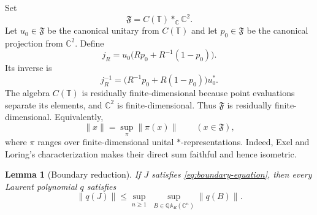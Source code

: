 \documentclass[preprints,article,submit,oneauthor]{Definitions/mdpi}
\newcounter{manuscriptresult}[section]
\theoremstyle{mdpi}
\newtheorem{lemma}[manuscriptresult]{Lemma}
\theoremstyle{definition}
\newcommand{\C}{\mathbb C}
\begin{document}
Set
\begin{equation}
  \mathfrak F=C(\mathbb T)*_{\C}\C^2.
  \label{eq:free-product}
\end{equation}
Let $u_0\in\mathfrak F$ be the canonical unitary from $C(\mathbb T)$
and let $p_0\in\mathfrak F$ be the canonical projection from $\C^2$.
Define
\begin{equation}
  j_R=u_0\bigl(Rp_0+R^{-1}(1-p_0)\bigr).
  \label{eq:universal-boundary-element}
\end{equation}
Its inverse is
\begin{equation}
  j_R^{-1}=\bigl(R^{-1}p_0+R(1-p_0)\bigr)u_0^*.
  \label{eq:universal-boundary-inverse}
\end{equation}
The algebra $C(\mathbb T)$ is residually finite-dimensional because
point evaluations separate its elements, and $\C^2$ is
finite-dimensional.  Thus $\mathfrak F$ is residually
finite-dimensional.  Equivalently,
\begin{equation}
  \lVert x\rVert
  =\sup_{\pi}\lVert\pi(x)\rVert
  \qquad(x\in\mathfrak F),
  \label{eq:RFD-norm}
\end{equation}
where $\pi$ ranges over finite-dimensional unital
$*$-representations.  Indeed, Exel and Loring's characterization
\cite[Theorem~2.4]{ExelLoring1992} makes their direct sum faithful and
hence isometric.

\begin{lemma}[Boundary reduction]
\label{lem:boundary-reduction}
If $J$ satisfies \eqref{eq:boundary-equation}, then every Laurent
polynomial $q$ satisfies
\begin{equation}
  \lVert q(J)\rVert
  \leq
  \sup_{n\geq1}\;
  \sup_{B\in\mathbb Q\mathbb A_R(\C^n)}
  \lVert q(B)\rVert.
  \label{eq:boundary-reduction}
\end{equation}
\end{lemma}
\end{document}
